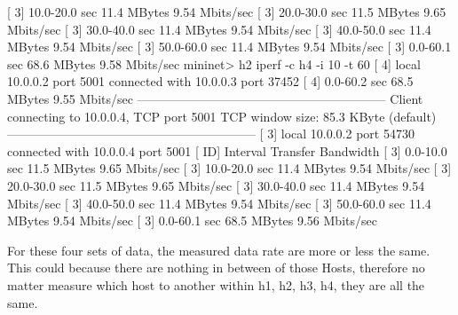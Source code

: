 						[  3] 10.0-20.0 sec  11.4 MBytes  9.54 Mbits/sec
						[  3] 20.0-30.0 sec  11.5 MBytes  9.65 Mbits/sec
						[  3] 30.0-40.0 sec  11.4 MBytes  9.54 Mbits/sec
						[  3] 40.0-50.0 sec  11.4 MBytes  9.54 Mbits/sec
						[  3] 50.0-60.0 sec  11.4 MBytes  9.54 Mbits/sec
						[  3]  0.0-60.1 sec  68.6 MBytes  9.58 Mbits/sec
						mininet> h2 iperf -c h4 -i 10 -t 60
						[  4] local 10.0.0.2 port 5001 connected with 10.0.0.3 port 37452
						[  4]  0.0-60.2 sec  68.5 MBytes  9.55 Mbits/sec
						------------------------------------------------------------
						Client connecting to 10.0.0.4, TCP port 5001
						TCP window size: 85.3 KByte (default)
						------------------------------------------------------------
						[  3] local 10.0.0.2 port 54730 connected with 10.0.0.4 port 5001
						[ ID] Interval       Transfer     Bandwidth
						[  3]  0.0-10.0 sec  11.5 MBytes  9.65 Mbits/sec
						[  3] 10.0-20.0 sec  11.4 MBytes  9.54 Mbits/sec
						[  3] 20.0-30.0 sec  11.5 MBytes  9.65 Mbits/sec
						[  3] 30.0-40.0 sec  11.4 MBytes  9.54 Mbits/sec
						[  3] 40.0-50.0 sec  11.4 MBytes  9.54 Mbits/sec
						[  3] 50.0-60.0 sec  11.4 MBytes  9.54 Mbits/sec
						[  3]  0.0-60.1 sec  68.5 MBytes  9.56 Mbits/sec

					For these four sets of data, the measured data rate are more or less the same. This could because there are nothing in between of those Hosts, therefore no matter measure which host to another within h1, h2, h3, h4, they are all the same.

